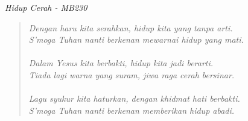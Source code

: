 \small
\begin{center}
\itshape{Hidup Cerah - MB230}
\end{center}


\begin{verse}
\itshape{
Dengan haru kita serahkan, hidup kita yang tanpa arti.\\
S'moga Tuhan nanti berkenan mewarnai hidup yang mati. \\
{~}\\
Dalam Yesus kita berbakti, hidup kita jadi berarti.\\
Tiada lagi warna yang suram, jiwa raga cerah bersinar.\\
{~}\\
Lagu syukur kita haturkan, dengan khidmat hati berbakti.\\
S'moga Tuhan nanti berkenan memberikan hidup abadi.
}
\end{verse}
\normalsize
